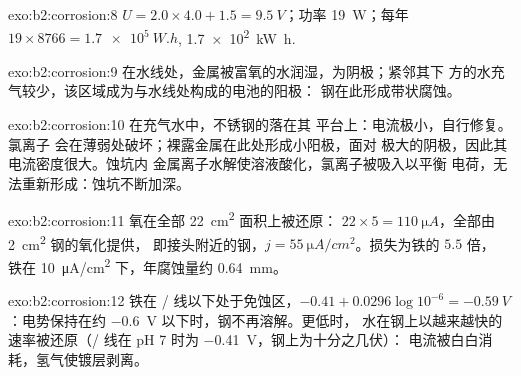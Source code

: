 \begin{solution}{exo:b2:corrosion:8}
$U = 2.0 \times 4.0 + 1.5 = \qty{9.5}{V}$；功率 \qty{19}{W}；每年 $19 \times
8766 = \qty{1.7e5}{W.h}$, \qty{1.7e2}{kW.h}.
\end{solution}

\begin{solution}{exo:b2:corrosion:9}
在水线处，金属被富氧的水润湿，为阴极；紧邻其下
方的水充气较少，该区域成为与水线处构成的电池的阳极：
钢在此形成带状腐蚀。
\end{solution}

\begin{solution}{exo:b2:corrosion:10}
在充气水中，不锈钢的落在其
平台上：电流极小，自行修复。氯离子
会在薄弱处破坏；裸露金属在此处形成小阳极，面对
极大的阴极，因此其电流密度很大。蚀坑内
金属离子水解使溶液酸化，氯离子被吸入以平衡
电荷，无法重新形成：蚀坑不断加深。
\end{solution}

\begin{solution}{exo:b2:corrosion:11}
氧在全部 \qty{22}{cm^2} 面积上被还原： $22 \times 5 =
\qty{110}{\micro A}$，全部由 \qty{2}{cm^2} 钢的氧化提供，
即接头附近的钢，$j = \qty{55}{\micro A/cm^2}$。损失为铁的 $5.5$ 倍，
铁在 \qty{10}{\micro A/cm^2} 下，年腐蚀量约 \qty{0.64}{mm}。
\end{solution}

\begin{solution}{exo:b2:corrosion:12}
铁在 / 线以下处于免蚀区，$-0.41 + 0.0296\log 10^{-6} =
\qty{-0.59}{V}$：电势保持在约 \qty{-0.6}{V} 以下时，钢不再溶解。更低时，
水在钢上以越来越快的速率被还原（/ 线在
pH 7 时为 \qty{-0.41}{V}，钢上为十分之几伏）：
电流被白白消耗，氢气使镀层剥离。
\end{solution}

